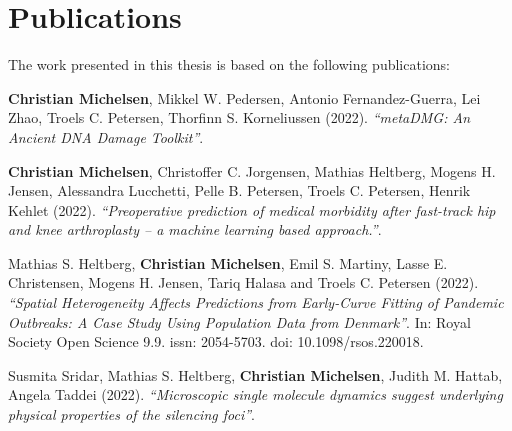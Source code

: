 \chapter{Publications}

The work presented in this thesis is based on the following publications:

\vspace{1.5cm}



\begin{description} [labelindent=1cm,style=multiline,leftmargin=3cm]
    \item [Paper 1:] \textbf{Christian Michelsen}, Mikkel W. Pedersen, Antonio Fernandez-Guerra, Lei Zhao, Troels C. Petersen, Thorfinn S. Korneliussen (2022). \emph{``metaDMG: An Ancient DNA Damage Toolkit''}. \\
    \item [Paper 2:] \textbf{Christian Michelsen}, Christoffer C. Jorgensen, Mathias Heltberg, Mogens H. Jensen, Alessandra Lucchetti, Pelle B. Petersen, Troels C. Petersen, Henrik Kehlet (2022). \emph{``Preoperative prediction of medical morbidity after fast-track hip and knee arthroplasty -- a machine learning based approach.''}. \\
    \item [Paper 3:] Mathias S. Heltberg, \textbf{Christian Michelsen}, Emil S. Martiny, Lasse E. Christensen, Mogens H. Jensen, Tariq Halasa and Troels C. Petersen (2022). \emph{``Spatial Heterogeneity Affects Predictions from Early-Curve Fitting of Pandemic Outbreaks: A Case Study Using Population Data from Denmark''}. In: Royal Society Open Science 9.9. issn: 2054-5703. doi: 10.1098/rsos.220018. \\
    \item [Paper 4:] Susmita Sridar, Mathias S. Heltberg, \textbf{Christian Michelsen}, Judith M. Hattab, Angela Taddei (2022). \emph{``Microscopic single molecule dynamics suggest underlying physical properties of the silencing foci''}.
\end{description}


